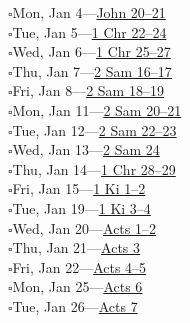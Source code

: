 \hypertarget{rp-2027-01-04}{}\noindent$\square$\enspace Mon, Jan 4\enspace---\enspace \hyperlink{ch-john-20}{John 20--21}\\
\hypertarget{rp-2027-01-05}{}\noindent$\square$\enspace Tue, Jan 5\enspace---\enspace \hyperlink{ch-1chronicles-22}{1 Chr 22--24}\\
\hypertarget{rp-2027-01-06}{}\noindent$\square$\enspace Wed, Jan 6\enspace---\enspace \hyperlink{ch-1chronicles-25}{1 Chr 25--27}\\
\hypertarget{rp-2027-01-07}{}\noindent$\square$\enspace Thu, Jan 7\enspace---\enspace \hyperlink{ch-2samuel-16}{2 Sam 16--17}\\
\hypertarget{rp-2027-01-08}{}\noindent$\square$\enspace Fri, Jan 8\enspace---\enspace \hyperlink{ch-2samuel-18}{2 Sam 18--19}\\
\hypertarget{rp-2027-01-11}{}\noindent$\square$\enspace Mon, Jan 11\enspace---\enspace \hyperlink{ch-2samuel-20}{2 Sam 20--21}\\
\hypertarget{rp-2027-01-12}{}\noindent$\square$\enspace Tue, Jan 12\enspace---\enspace \hyperlink{ch-2samuel-22}{2 Sam 22--23}\\
\hypertarget{rp-2027-01-13}{}\noindent$\square$\enspace Wed, Jan 13\enspace---\enspace \hyperlink{ch-2samuel-24}{2 Sam 24}\\
\hypertarget{rp-2027-01-14}{}\noindent$\square$\enspace Thu, Jan 14\enspace---\enspace \hyperlink{ch-1chronicles-28}{1 Chr 28--29}\\
\hypertarget{rp-2027-01-15}{}\noindent$\square$\enspace Fri, Jan 15\enspace---\enspace \hyperlink{ch-1kings-1}{1 Ki 1--2}\\
\hypertarget{rp-2027-01-19}{}\noindent$\square$\enspace Tue, Jan 19\enspace---\enspace \hyperlink{ch-1kings-3}{1 Ki 3--4}\\
\hypertarget{rp-2027-01-20}{}\noindent$\square$\enspace Wed, Jan 20\enspace---\enspace \hyperlink{ch-acts-1}{Acts 1--2}\\
\hypertarget{rp-2027-01-21}{}\noindent$\square$\enspace Thu, Jan 21\enspace---\enspace \hyperlink{ch-acts-3}{Acts 3}\\
\hypertarget{rp-2027-01-22}{}\noindent$\square$\enspace Fri, Jan 22\enspace---\enspace \hyperlink{ch-acts-4}{Acts 4--5}\\
\hypertarget{rp-2027-01-25}{}\noindent$\square$\enspace Mon, Jan 25\enspace---\enspace \hyperlink{ch-acts-6}{Acts 6}\\
\hypertarget{rp-2027-01-26}{}\noindent$\square$\enspace Tue, Jan 26\enspace---\enspace \hyperlink{ch-acts-7}{Acts 7}\\
